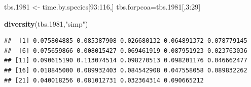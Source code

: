 \documentclass[]{article}
\newenvironment{Shaded}{\begin{snugshade}}{\end{snugshade}}
\newcommand{\KeywordTok}[1]{\textcolor[rgb]{0.13,0.29,0.53}{\textbf{{#1}}}}
\newcommand{\DecValTok}[1]{\textcolor[rgb]{0.00,0.00,0.81}{{#1}}}
\newcommand{\FloatTok}[1]{\textcolor[rgb]{0.00,0.00,0.81}{{#1}}}
\newcommand{\StringTok}[1]{\textcolor[rgb]{0.31,0.60,0.02}{{#1}}}
\newcommand{\NormalTok}[1]{{#1}}
\begin{document}
\begin{Shaded}
\begin{Highlighting}[]
\NormalTok{tbs}\FloatTok{.1981} \NormalTok{<-}\StringTok{ }\NormalTok{time.by.species[}\DecValTok{93}\NormalTok{:}\DecValTok{116}\NormalTok{,]}
\NormalTok{tbs.forpcoa=tbs}\FloatTok{.1981}\NormalTok{[,}\DecValTok{3}\NormalTok{:}\DecValTok{29}\NormalTok{]}

\KeywordTok{diversity}\NormalTok{(tbs}\FloatTok{.1981}\NormalTok{,}\StringTok{"simp"}\NormalTok{)}
\end{Highlighting}
\end{Shaded}

\begin{verbatim}
##  [1] 0.075804885 0.085387908 0.026680132 0.064891372 0.078779145
##  [6] 0.075659866 0.008015427 0.069461919 0.087951923 0.023763036
## [11] 0.090615190 0.113074514 0.098270513 0.098201176 0.046662477
## [16] 0.018845000 0.089932403 0.084542908 0.047558058 0.089832262
## [21] 0.040018256 0.081012731 0.032364314 0.090665212
\end{verbatim}
\end{document}
